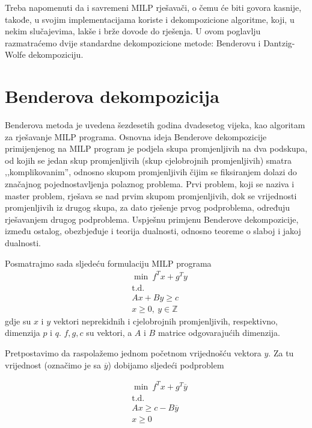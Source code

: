 \documentclass[a4paper, utf8, 11pt, colorlinks]{book}
\theoremstyle{definition}
\begin{document}
Treba napomenuti da i savremeni MILP rješavači, o čemu će biti govora kasnije, takođe, u svojim implementacijama koriste i dekompozicione algoritme, koji, u nekim slučajevima, lakše i brže dovode do rješenja. U ovom poglavlju razmatraćemo dvije standardne dekompozicione metode: Benderovu i Dantzig-Wolfe dekompoziciju.
 
 \section{Benderova dekompozicija}
 
 Benderova metoda je uvedena šezdesetih godina dvadesetog vijeka, kao algoritam za rješavanje MILP programa. 
 Osnovna ideja Benderove dekompozicije primijenjenog na MILP program je podjela skupa promjenljivih na dva podskupa, od kojih se jedan skup promjenljivih (skup cjelobrojnih promjenljivih) smatra ,,komplikovanim'', odnosno skupom promjenljivih čijim se fiksiranjem dolazi do značajnog pojednostavljenja polaznog problema. Prvi problem, koji se naziva i master problem,  rješava se nad prvim skupom promjenljivih, dok se vrijednosti promjenljivih iz drugog skupa,  za dato rješenje prvog podproblema, određuju rješavanjem drugog podproblema. Uspješnu primjenu Benderove dekompozicije, između ostalog, obezbjeđuje i teorija dualnosti, odnosno teoreme o slaboj i jakoj dualnosti.
 

 Posmatrajmo sada sljedeću formulaciju MILP programa
\begin{equation}
 \begin{aligned}\label{bender1}
  &\min\  f^Tx+g^Ty\\
 & \mbox{t.d.}\\
  &Ax+By\geqslant c\\
 &x\geqslant 0,\ y \in \mathbb{Z}
 \end{aligned}
\end{equation}
 gdje su $x$ i $y$ vektori neprekidnih i cjelobrojnih promjenljivih, respektivno, dimenzija $p$ i $q$. $f,g,c$ su vektori, a $A$ i $B$ matrice odgovarajućih dimenzija. 
 
 Pretpostavimo da raspolažemo jednom početnom vrijednošću vektora $y$. Za tu vrijednost (označimo je sa $\overline{y}$) dobijamo sljedeći podproblem

\begin{equation}
	\begin{aligned}\label{bender2}
 			&\min\  f^Tx+g^T\overline{y}\\
 		& \mbox{t.d.}\\
 		& Ax\geqslant c-B\overline{y}\\
 		& x\geqslant 0
 \end{aligned}
\end{equation}
\end{document}
